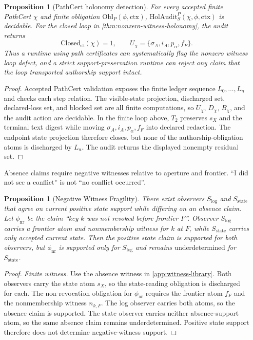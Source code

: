 \documentclass[11pt,twoside]{article}
\newtheorem{proposition}[theorem]{Proposition}
\theoremstyle{definition}
\newcommand{\Obl}{\mathrm{Obl}}
\newcommand{\ctx}{\mathrm{ctx}}
\newcommand{\underdetermined}{\mathrm{underdetermined}}
\begin{document}
\begin{proposition}[PathCert holonomy detection]
\label{prop:pathcert-holonomy-detection}
For every accepted finite PathCert $\chi$ and finite obligation
$\Obl_P(\phi,\ctx)$, $\mathrm{HolAudit}_S^P(\chi,\phi,\ctx)$ is decidable.
For the closed loop in \cref{thm:nonzero-witness-holonomy}, the audit returns
\[
  \mathrm{Closed}_{\mathrm{st}}(\chi)=1,\qquad
  U_\chi=\{\sigma_A,i_A,p_\alpha,f_F\}.
\]
Thus a runtime using path certificates can systematically flag the nonzero
witness loop defect, and a strict support-preservation runtime can reject any
claim that the loop transported authorship support intact.
\end{proposition}

\begin{proof}
Accepted PathCert validation exposes the finite ledger sequence
$L_0,\ldots,L_n$ and checks each step relation. The visible-state projection,
discharged set, declared-loss set, and blocked set are all finite computations,
so $U_\chi$, $D_\chi$, $B_\chi$, and the audit action are decidable. In the
finite loop above, $T_2$ preserves $s_X$ and the terminal text digest while
moving $\sigma_A,i_A,p_\alpha,f_F$ into declared redaction. The endpoint state
projection therefore closes, but none of the authorship-obligation atoms is
discharged by $L_n$. The audit returns the displayed nonempty residual set.
\end{proof}

Absence claims require negative witnesses relative to aperture and frontier.
\enquote{I did not see a conflict} is not \enquote{no conflict occurred}.

\begin{proposition}[Negative Witness Fragility]
\label{prop:negative-witness-fragility}
There exist observers $S_{\log}$ and $S_{\mathrm{state}}$ that agree on current
positive state support while differing on an absence claim. Let
$\phi_{\mathrm{nr}}$ be the claim \enquote{key $k$ was not revoked before
frontier $F$}. Observer $S_{\log}$ carries a frontier atom and nonmembership
witness for $k$ at $F$, while $S_{\mathrm{state}}$ carries only accepted current state.
Then the positive state claim is supported for both observers, but
$\phi_{\mathrm{nr}}$ is supported only for $S_{\log}$ and remains
$\underdetermined$ for $S_{\mathrm{state}}$.
\end{proposition}

\begin{proof}
\textit{Finite witness.}
Use the absence witness in \cref{app:witness-library}. Both observers carry
the state atom $s_X$, so the state-reading obligation is discharged for each.
The non-revocation obligation for $\phi_{\mathrm{nr}}$ requires the frontier
atom $f_F$ and the nonmembership witness $n_{k,F}$. The log observer carries
both atoms, so the absence claim is supported. The state observer carries
neither absence-support atom, so the same absence claim remains
$\underdetermined$. Positive state support therefore does not determine
negative-witness support.
\end{proof}
\end{document}
